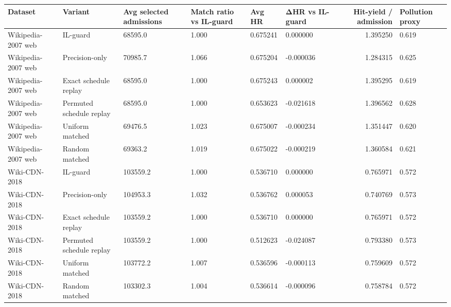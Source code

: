 \begin{tabular}{llllllrl}
\toprule
Dataset & Variant & Avg selected admissions & Match ratio vs IL-guard & Avg HR & ΔHR vs IL-guard & Hit-yield / admission & Pollution proxy \\
\midrule
Wikipedia-2007 web & IL-guard & 68595.0 & 1.000 & 0.675241 & 0.000000 & 1.395250 & 0.619 \\
Wikipedia-2007 web & Precision-only & 70985.7 & 1.066 & 0.675204 & -0.000036 & 1.284315 & 0.625 \\
Wikipedia-2007 web & Exact schedule replay & 68595.0 & 1.000 & 0.675243 & 0.000002 & 1.395295 & 0.619 \\
Wikipedia-2007 web & Permuted schedule replay & 68595.0 & 1.000 & 0.653623 & -0.021618 & 1.396562 & 0.628 \\
Wikipedia-2007 web & Uniform matched & 69476.5 & 1.023 & 0.675007 & -0.000234 & 1.351447 & 0.620 \\
Wikipedia-2007 web & Random matched & 69363.2 & 1.019 & 0.675022 & -0.000219 & 1.360584 & 0.621 \\
Wiki-CDN-2018 & IL-guard & 103559.2 & 1.000 & 0.536710 & 0.000000 & 0.765971 & 0.572 \\
Wiki-CDN-2018 & Precision-only & 104953.3 & 1.032 & 0.536762 & 0.000053 & 0.740769 & 0.573 \\
Wiki-CDN-2018 & Exact schedule replay & 103559.2 & 1.000 & 0.536710 & 0.000000 & 0.765971 & 0.572 \\
Wiki-CDN-2018 & Permuted schedule replay & 103559.2 & 1.000 & 0.512623 & -0.024087 & 0.793380 & 0.573 \\
Wiki-CDN-2018 & Uniform matched & 103772.2 & 1.007 & 0.536596 & -0.000113 & 0.759609 & 0.572 \\
Wiki-CDN-2018 & Random matched & 103302.3 & 1.004 & 0.536614 & -0.000096 & 0.758784 & 0.572 \\
\bottomrule
\end{tabular}
